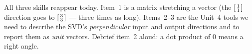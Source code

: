 \documentclass[10pt]{article}
\begin{document}
\begin{teachernote}
All three skills reappear today. Item~1 is a matrix stretching a vector (the $\begin{bsmallmatrix}1\\1\end{bsmallmatrix}$
direction goes to $\begin{bsmallmatrix}3\\3\end{bsmallmatrix}$ --- three times as long). Items~2--3 are the
Unit~4 tools we need to describe the SVD's \emph{perpendicular} input and output directions and to
report them as \emph{unit} vectors. Debrief item~2 aloud: a dot product of $0$ means a right angle.
\end{teachernote}
\end{document}
